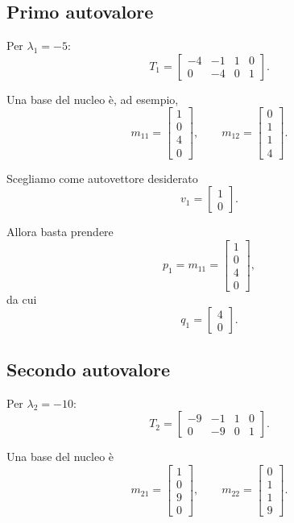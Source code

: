 \subsection{Primo autovalore}

Per \(\lambda_1=-5\):
\[
T_1=
\begin{bmatrix}
-4 & -1 & 1 & 0\\
0 & -4 & 0 & 1
\end{bmatrix}.
\]

Una base del nucleo è, ad esempio,
\[
m_{11}=
\begin{bmatrix}
1\\0\\4\\0
\end{bmatrix},
\qquad
m_{12}=
\begin{bmatrix}
0\\1\\1\\4
\end{bmatrix}.
\]

Scegliamo come autovettore desiderato
\[
v_1=
\begin{bmatrix}
1\\0
\end{bmatrix}.
\]

Allora basta prendere
\[
p_1=m_{11}=
\begin{bmatrix}
1\\0\\4\\0
\end{bmatrix},
\]
da cui
\[
q_1=
\begin{bmatrix}
4\\0
\end{bmatrix}.
\]

\subsection{Secondo autovalore}

Per \(\lambda_2=-10\):
\[
T_2=
\begin{bmatrix}
-9 & -1 & 1 & 0\\
0 & -9 & 0 & 1
\end{bmatrix}.
\]

Una base del nucleo è
\[
m_{21}=
\begin{bmatrix}
1\\0\\9\\0
\end{bmatrix},
\qquad
m_{22}=
\begin{bmatrix}
0\\1\\1\\9
\end{bmatrix}.
\]

